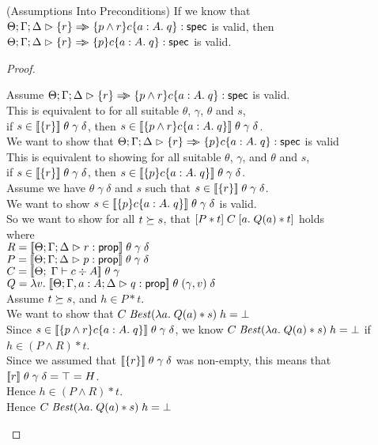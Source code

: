 \begin{lemma}{(Assumptions Into Preconditions)}
If we know that $\judgeS{\setof{r} \specimp \spec{p \land r}{c}{a:A}{q}}$ is
valid, then $\judgeS{\setof{r} \specimp \spec{p}{c}{a:A}{q}}$ is valid.
\end{lemma}

\begin{proof}
\begin{tabbedproof}
  \oo Assume $\judgeS{\setof{r} \specimp \spec{p \land r}{c}{a:A}{q}}$ is valid. \\
  \ooo This is equivalent to for all suitable $\theta$, $\gamma$, $\theta$ and $s$, \\
  \ooox if $s \in \interp{\setof{r}}\;\theta\;\gamma\;\delta$, then $s \in \interp{\spec{p \land r}{c}{a:A}{q}}\;\theta\;\gamma\;\delta$. \\
  \ooo We want to show that $\judgeS{\setof{r} \specimp \spec{p}{c}{a:A}{q}}$ is valid \\
  \ooo This is equivalent to showing for all suitable $\theta$, $\gamma$, and $\theta$ and $s$, \\
  \ooox if $s \in \interp{\setof{r}}\;\theta\;\gamma\;\delta$, then $s \in \interp{\spec{p}{c}{a:A}{q}}\;\theta\;\gamma\;\delta$. \\
  \ooo Assume we have $\theta\;\gamma\;\delta$ and $s$ such that $s \in \interp{\setof{r}}\;\theta\;\gamma\;\delta$. \\
  \oooo We want to show $s \in \interp{\spec{p}{c}{a:A}{q}}\;\theta\;\gamma\;\delta$ is valid. \\
  \oooo So we want to show for all $t \worldgeq s$, that $\basicspec{P*t}{C}{a}{Q(a) * t}$ holds\\
  \ooox where \\
  \oooox $R = \interp{\judgeA{r}{\assert}}\;\theta\;\gamma\;\delta$ \\
  \oooox $P = \interp{\judgeA{p}{\assert}}\;\theta\;\gamma\;\delta$ \\
  \oooox $C = \interp{\judgeC[\Theta]{\Gamma}{c}{A}}\;\theta\;\gamma$ \\
  \oooox $Q = \semfun{v}{\interp{\judgeA[\Theta; \Gamma, a:A; \Delta]{q}{\assert}}\;\theta\;(\gamma, v)\;\delta}$ \\
  \oooo Assume $t \worldgeq s$, and $h \in P * t$. \\
  \ooooo We want to show that $C\;\mathit{Best}(\semfun{a}{Q(a) * s})\;h = \bot$ \\
  \ooooo Since $s \in \interp{\spec{p \land r}{c}{a:A}{q}}\;\theta\;\gamma\;\delta$, we know $C\;\mathit{Best}(\semfun{a}{Q(a) * s})\;h = \bot$ if  $h \in (P \land R) * t$. \\
  \ooooo Since we assumed that $\interp{\setof{r}}\;\theta\;\gamma\;\delta$ was non-empty, this means that $\interp{r}\;\theta\;\gamma\;\delta = \top = H$. \\
  \ooooo Hence $h \in (P \land R) * t$. \\
  \ooooo Hence $C\;\mathit{Best}(\semfun{a}{Q(a) * s})\;h = \bot$ \\ 
\end{tabbedproof}
\end{proof}

